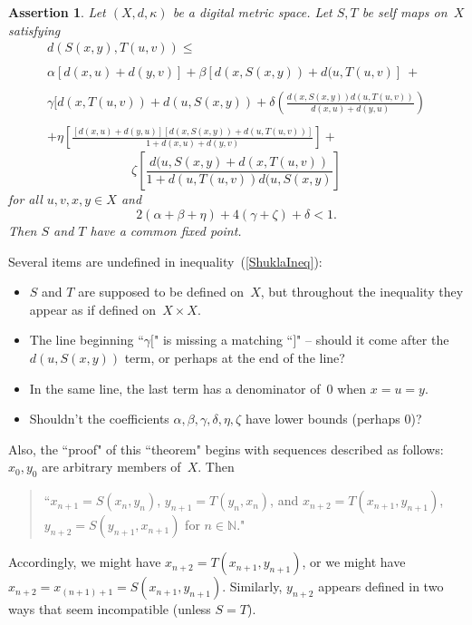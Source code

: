 \documentclass{article}
\newtheorem{assert}[thm]{Assertion}
\numberwithin{thm}{section}
\def\N{{\mathbb N}}
\begin{document}
\begin{assert}
\label{ShuklaThm}
    Let $(X,d,\kappa)$
    be a digital metric
    space. Let $S,T$
    be self maps on~$X$
    satisfying
\[        \begin{array}{c}
        d(S(x,y),T(u,v)) \le \\ \\
        \alpha [d(x,u)+d(y,v)]+
        \beta [d(x,S(x,y))+d(u,T(u,v)] ~+ 
        \\ \\
        \gamma [ d(x,T(u,v)) + d(u,S(x,y)) +
        \delta \left ( \frac{ d(x,S(x,y)) d(u,T(u,v))}{d(x,u)+d(y,u)}
        \right )
        \\ \\
        + \eta \left [
        \frac{[d(x,u) + d(y,u)] [d(x,S(x,y)) + d(u,T(u,v))]}{1+d(x,u)+d(y,v)}
        \right ] +
               \end{array}
       \]
\begin{equation}
\label{ShuklaIneq}
        \zeta \left [
        \frac{d(u,S(x,y)+ d(x,T(u,v))}{1+d(u,T(u,v)) d(u,S(x,y)}
        \right ]
    \end{equation}
for all $u,v,x,y \in X$
and 
\[ 2(\alpha + \beta + \eta) + 4(\gamma + \zeta) + \delta < 1.
\]
Then $S$ and $T$ have a
common fixed point.
\end{assert}

Several items are
undefined in inequality~(\ref{ShuklaIneq}):
\begin{itemize}
    \item $S$ and $T$
    are supposed to be
    defined on~$X$, but
    throughout the inequality they appear as if defined
    on~$X \times X$.
    \item The line beginning ``$\gamma [$" is missing a
    matching ``$]$" --
    should it come after
    the $d(u,S(x,y))$
    term, or perhaps at
    the end of the line?
    \item In the same
    line, the last term
    has a denominator 
    of~0 when $x=u=y$.
    \item Shouldn't the
    coefficients $\alpha, \beta, \gamma, \delta, \eta, \zeta$ have
    lower bounds (perhaps 0)?
\end{itemize}

Also, the ``proof" of
this ``theorem" begins
with sequences described
as follows: $x_0,y_0$
are arbitrary members
of~$X$. Then
\begin{quote}
``$x_{n+1}= S(x_n,y_n)$, $y_{n+1}=T(y_n,x_n)$,
and $x_{n+2}=T(x_{n+1},y_{n+1})$, $y_{n+2}=S(y_{n+1},x_{n+1})$ for $n \in \N$."
\end{quote}
Accordingly, we might have
$x_{n+2}=T(x_{n+1},y_{n+1})$, or we might have
$x_{n+2}=x_{(n+1)+1}=S(x_{n+1},y_{n+1})$. Similarly, $y_{n+2}$
appears defined in two
ways that seem incompatible (unless $S=T$).
\end{document}
